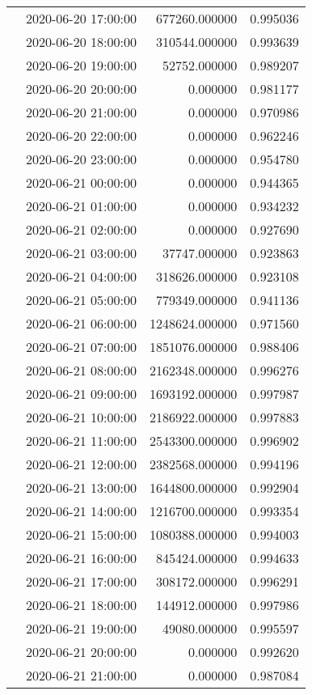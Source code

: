 \begin{tabular}{llrr}
 & 2020-06-20 17:00:00 & 677260.000000 & 0.995036 \\
 & 2020-06-20 18:00:00 & 310544.000000 & 0.993639 \\
 & 2020-06-20 19:00:00 & 52752.000000 & 0.989207 \\
 & 2020-06-20 20:00:00 & 0.000000 & 0.981177 \\
 & 2020-06-20 21:00:00 & 0.000000 & 0.970986 \\
 & 2020-06-20 22:00:00 & 0.000000 & 0.962246 \\
 & 2020-06-20 23:00:00 & 0.000000 & 0.954780 \\
 & 2020-06-21 00:00:00 & 0.000000 & 0.944365 \\
 & 2020-06-21 01:00:00 & 0.000000 & 0.934232 \\
 & 2020-06-21 02:00:00 & 0.000000 & 0.927690 \\
 & 2020-06-21 03:00:00 & 37747.000000 & 0.923863 \\
 & 2020-06-21 04:00:00 & 318626.000000 & 0.923108 \\
 & 2020-06-21 05:00:00 & 779349.000000 & 0.941136 \\
 & 2020-06-21 06:00:00 & 1248624.000000 & 0.971560 \\
 & 2020-06-21 07:00:00 & 1851076.000000 & 0.988406 \\
 & 2020-06-21 08:00:00 & 2162348.000000 & 0.996276 \\
 & 2020-06-21 09:00:00 & 1693192.000000 & 0.997987 \\
 & 2020-06-21 10:00:00 & 2186922.000000 & 0.997883 \\
 & 2020-06-21 11:00:00 & 2543300.000000 & 0.996902 \\
 & 2020-06-21 12:00:00 & 2382568.000000 & 0.994196 \\
 & 2020-06-21 13:00:00 & 1644800.000000 & 0.992904 \\
 & 2020-06-21 14:00:00 & 1216700.000000 & 0.993354 \\
 & 2020-06-21 15:00:00 & 1080388.000000 & 0.994003 \\
 & 2020-06-21 16:00:00 & 845424.000000 & 0.994633 \\
 & 2020-06-21 17:00:00 & 308172.000000 & 0.996291 \\
 & 2020-06-21 18:00:00 & 144912.000000 & 0.997986 \\
 & 2020-06-21 19:00:00 & 49080.000000 & 0.995597 \\
 & 2020-06-21 20:00:00 & 0.000000 & 0.992620 \\
 & 2020-06-21 21:00:00 & 0.000000 & 0.987084 \\

\end{tabular}
